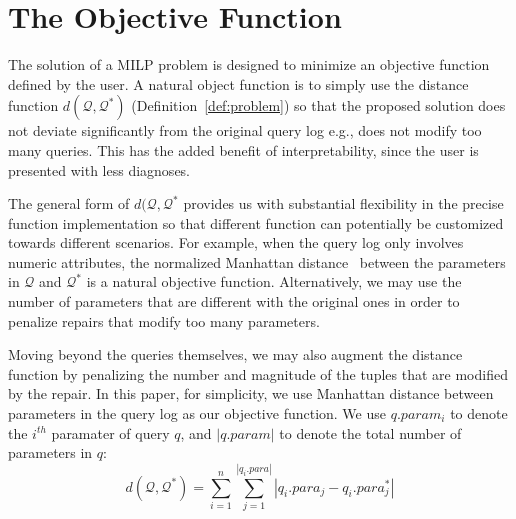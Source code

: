 \section{The Objective Function}

The solution of a MILP problem is designed to minimize an objective function defined by the user.
A natural object function is to simply use the distance function $d(\mathcal{Q}, \mathcal{Q}^*)$ 
(Definition~\ref{def:problem}) so that the proposed solution
does not deviate significantly from the original query log e.g., does not modify too many queries.  
This has the added benefit of interpretability, since the user is presented with less diagnoses.

The general form of $d(\mathcal{Q}, \mathcal{Q}^*$ provides us with substantial flexibility in the precise
function implementation so that different function can potentially be customized towards different scenarios.
For example, when the query log only involves numeric attributes, 
the normalized Manhattan distance~\cite{manhattan} between the parameters 
in $\mathcal{Q}$ and $\mathcal{Q}^*$ is a natural objective function.
Alternatively, we may use the number of parameters that are different with the original ones 
in order to penalize repairs that modify too many parameters. 

Moving beyond the queries themselves, we may also augment the distance function
by penalizing the number and magnitude of the tuples that are modified by the repair.
In this paper, for simplicity, we use Manhattan distance between parameters 
in the query log as our objective function.  We use $q.param_i$ to denote the $i^{th}$ paramater of query $q$,
and $|q.param|$ to denote the total number of parameters in $q$:
\[d(\mathcal{Q}, \mathcal{Q}^*) = \sum_{i = 1} ^{n} \sum_{j = 1}^{|q_i.para|} |q_i.para_j - q_i.para_j^*|\]

% 
% 
% 
